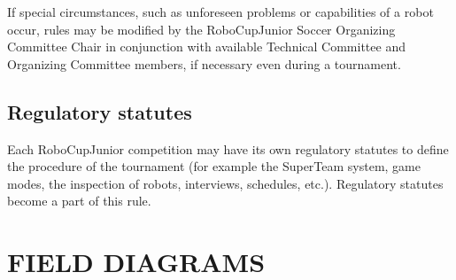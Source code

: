 \documentclass{article}
\begin{document}
If special circumstances, such as unforeseen problems or capabilities of a
robot occur, rules may be modified by the RoboCupJunior Soccer Organizing
Committee Chair in conjunction with available Technical Committee and
Organizing Committee members, if necessary even during a tournament.

\subsection{Regulatory statutes \label{ref-051}}

Each RoboCupJunior competition may have its own regulatory statutes to define
the procedure of the tournament (for example the SuperTeam system, game modes,
the inspection of robots, interviews, schedules, etc.). Regulatory statutes
become a part of this rule.

\section*{FIELD DIAGRAMS}
\end{document}
